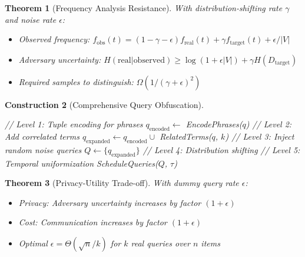 \documentclass[11pt,final]{article}
\newtheorem{theorem}{Theorem}[section]
\newtheorem{construction}[theorem]{Construction}
\begin{document}
\begin{theorem}[Frequency Analysis Resistance]
With distribution-shifting rate $\gamma$ and noise rate $\epsilon$:
\begin{itemize}
    \item Observed frequency: $f_{\text{obs}}(t) = (1-\gamma-\epsilon)f_{\text{real}}(t) + \gamma f_{\text{target}}(t) + \epsilon/|V|$
    \item Adversary uncertainty: $H(\text{real}|\text{observed}) \geq \log(1 + \epsilon|V|) + \gamma H(D_{\text{target}})$
    \item Required samples to distinguish: $\Omega(1/(\gamma + \epsilon)^2)$
\end{itemize}
\end{theorem}

\begin{construction}[Comprehensive Query Obfuscation]
\begin{algorithm}[H]
\caption{Multi-Level Query Obfuscation with All Strategies}
// Level 1: Tuple encoding for phrases\;
$q_{\text{encoded}} \gets$ EncodePhrases($q$)\;
// Level 2: Add correlated terms\;
$q_{\text{expanded}} \gets q_{\text{encoded}} \cup$ RelatedTerms($q$, $k$)\;
// Level 3: Inject random noise queries\;
$Q \gets \{q_{\text{expanded}}\}$\;
// Level 4: Distribution shifting\;
// Level 5: Temporal uniformization\;
ScheduleQueries($Q$, $\tau$)\;
\end{algorithm}
\end{construction}

\begin{theorem}[Privacy-Utility Trade-off]
With dummy query rate $\epsilon$:
\begin{itemize}
    \item Privacy: Adversary uncertainty increases by factor $(1 + \epsilon)$
    \item Cost: Communication increases by factor $(1 + \epsilon)$
    \item Optimal $\epsilon = \Theta(\sqrt{n}/k)$ for $k$ real queries over $n$ items
\end{itemize}
\end{theorem}
\end{document}
